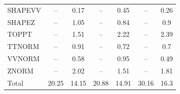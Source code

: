 \begin{table}[H]
\begin{center}
\begin{footnotesize}
\begin{tabular}{lcccccc}
				SHAPEVV & -- &  0.17 & -- &  0.45 & -- &  0.26 \\
				SHAPEZ & -- &  1.05 & -- &  0.84 & -- &  0.9 \\
				TOPPT & -- &  1.51 & -- &  2.22 & -- &  2.39 \\
				TTNORM & -- &  0.91 & -- &  0.72 & -- &  0.7 \\
				VVNORM & -- &  0.58 & -- &  0.95 & -- &  0.49 \\
				ZNORM & -- &  2.02 & -- &  1.51 & -- &  1.81 \\
				Total &  20.25  &  14.15 &  20.88  &  14.91 &  30.16  &  16.3 \\ \hline \hline
			\end{tabular}
			\label{tab:SysUncertainties_1500}
        \end{footnotesize}
	\end{center}
\end{table}


